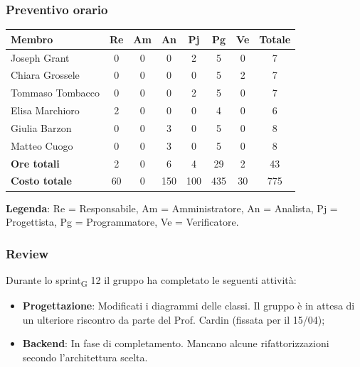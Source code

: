 \documentclass[11pt,a4paper]{article}
\newcommand{\gls}[1]{#1\textsubscript{G}}
\begin{document}
\subsubsection{Preventivo orario}
\begin{center}
    \begin{tabular}{|l|c|c|c|c|c|c|c|}
        \hline
        \textbf{Membro} & \textbf{Re} & \textbf{Am} & \textbf{An} & \textbf{Pj} & \textbf{Pg} & \textbf{Ve} & \textbf{Totale} \\
        \hline
        Joseph Grant & 0 & 0 & 0 & 2 & 5 & 0 & 7 \\
        \hline
        Chiara Grossele & 0 & 0 & 0 & 0 & 5 & 2 & 7 \\
        \hline
        Tommaso Tombacco & 0 & 0 & 0 & 2 & 5 & 0 & 7 \\
        \hline
        Elisa Marchioro & 2 & 0 & 0 & 0 & 4 & 0 & 6 \\
        \hline
        Giulia Barzon & 0 & 0 & 3 & 0 & 5 & 0 & 8 \\
        \hline
        Matteo Cuogo & 0 & 0 & 3 & 0 & 5 & 0 & 8 \\
        \hline
        \textbf{Ore totali} & 2 & 0 & 6 & 4 & 29 & 2 & 43 \\
        \hline
        \textbf{Costo totale} & 60 & 0 & 150 & 100 & 435 & 30 & 775 \\
        \hline
    \end{tabular}
\end{center}

\noindent \textbf{Legenda}: Re = Responsabile, Am = Amministratore, An = Analista, Pj = Progettista, Pg = Programmatore, Ve = Verificatore.


\subsubsection{Review}
Durante lo \gls{sprint} 12 il gruppo ha completato le seguenti attività:
\begin{itemize}
    \item \textbf{Progettazione}: Modificati i diagrammi delle classi. Il gruppo è in attesa di un ulteriore riscontro da parte del Prof. Cardin (fissata per il 15/04);
    \item \textbf{Backend}: In fase di completamento. Mancano alcune rifattorizzazioni secondo l'architettura scelta.
\end{itemize}
\end{document}
